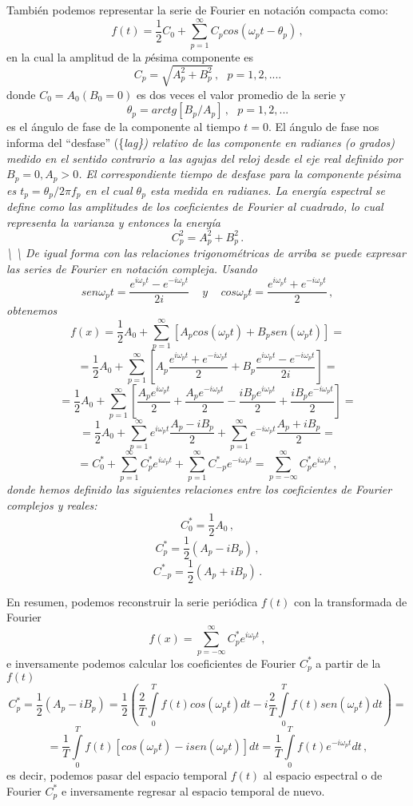 \documentclass[
]{agujournal2019}
\begin{document}
También podemos representar la serie de Fourier en notación compacta
como:
\[f(t)=\frac{1}{2}C_0 +\sum\limits^\infty_{p=1}C_p cos(\omega_p t - \theta_p)\,,\]
en la cual la amplitud de la \(p\)ésima componente es
\[C_p=\sqrt{A_p^2+B_p^2}\,,\,\,\,\,p=1,2,....\] donde
\(C_0=A_0 (B_0=0)\) es dos veces el valor promedio de la serie y
\[\theta_p=arctg[B_p/A_p]\,,\,\,\,\,p=1,2,...\] es el ángulo de fase de
la componente al tiempo \(t=0\). El ángulo de fase nos informa del
``desfase'' (\{\it lag\}) relativo de las componente en radianes (o
grados) medido en el sentido contrario a las agujas del reloj desde el
eje real definido por \(B_p=0, A_p>0\). El correspondiente tiempo de
desfase para la componente \(p\)ésima es \(t_p=\theta_p/2\pi f_p\) en el
cual \(\theta_p\) esta medida en radianes. La energía espectral se
define como las amplitudes de los coeficientes de Fourier al cuadrado,
lo cual representa la varianza y entonces la energía
\[C^2_p=A_p^2 + B_p^2\,.\] \textbackslash{} \textbackslash{} De igual
forma con las relaciones trigonométricas de arriba se puede expresar las
series de Fourier en notación compleja. Usando
\[sen\omega_p t=\frac{e^{i\omega_pt}-e^{-i\omega_pt}}{2i}\,\,\,\,\,\,\,y\,\,\,\,\,\,\,
cos\omega_p t=\frac{e^{i\omega_pt}+e^{-i\omega_pt}}{2}\,,\] obtenemos
\[f(x)=\frac{1}{2}A_0 +\sum\limits^\infty_{p=1}[A_p cos(\omega_p t) + B_p sen(\omega_p t)]=\]
\[=\frac{1}{2}A_0 +\sum\limits^\infty_{p=1}\left[ A_p \frac{e^{i\omega_pt}+e^{-i\omega_pt}}{2} + B_p \frac{e^{i\omega_pt}-e^{-i\omega_pt}}{2i}\right]=\]
\[=\frac{1}{2}A_0+\sum\limits^\infty_{p=1}\left[\frac{A_p e^{i\omega_p t}}{2} + \frac{A_p e^{-i\omega_p t}}{2} -
\frac{iB_p e^{i\omega_p t}}{2} + \frac{iB_p e^{-i\omega_p t}}{2} \right]=\]
\[=\frac{1}{2}A_0+\sum\limits^\infty_{p=1} e^{i\omega_p t}\frac{A_p-iB_p}{2} +
                  \sum\limits^\infty_{p=1} e^{-i\omega_p t}\frac{A_p+iB_p}{2}=\]
\[=C^*_0 + \sum\limits^\infty_{p=1}C^*_pe^{i\omega_p t} + \sum\limits^\infty_{p=1}C^*_{-p} e^{-i\omega_p t}=
\sum\limits^\infty_{p=-\infty} C^*_p e^{i\omega_p t}\,,\] donde hemos
definido las siguientes relaciones entre los coeficientes de Fourier
complejos y reales: \[C^*_0=\frac{1}{2}A_0\,,\]
\[C^*_p=\frac{1}{2}(A_p-iB_p)\,,\] \[C^*_{-p}=\frac{1}{2}(A_p+iB_p)\,.\]

En resumen, podemos reconstruir la serie periódica \(f(t)\) con la
transformada de Fourier
\[f(x)=\sum\limits^\infty_{p=-\infty} C^*_p e^{i\omega_p t}\,,\] e
inversamente podemos calcular los coeficientes de Fourier \(C^*_p\) a
partir de la \(f(t)\)
\[C^*_p=\frac{1}{2}(A_p-iB_p)=\frac{1}{2}\left(\frac{2}{T}\int\limits_0^{T} f(t) cos(\omega_p t) dt -
                                             i \frac{2}{T}\int\limits_0^{T} f(t) sen(\omega_p t) dt \right)=\]
\[=\frac{1}{T}\int\limits_0^{T} f(t) [cos(\omega_p t) - isen(\omega_p t) ]dt = \frac{1}{T}\int\limits_0^{T} f(t) e^{-i \omega_p t} dt\,,\]
es decir, podemos pasar del espacio temporal \(f(t)\) al espacio
espectral o de Fourier \(C^*_p\) e inversamente regresar al espacio
temporal de nuevo.
\end{document}
